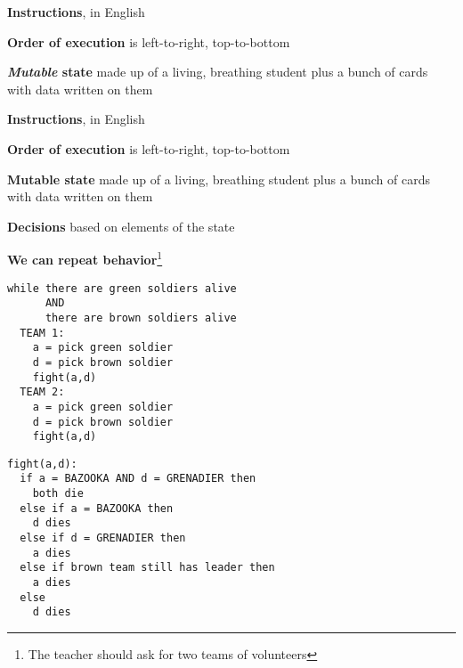 \documentclass{beamer}
\begin{document}
\begin{slide}{
\item \textbf{Instructions}, in English
\item \textbf{Order of execution} is left-to-right, top-to-bottom
\item \textbf{\textit{Mutable} state} made up of a living, breathing student plus a bunch of cards with data written on them
}\end{slide}


\begin{slide}{
\item \textbf{Instructions}, in English
\item \textbf{Order of execution} is left-to-right, top-to-bottom
\item \textbf{Mutable state} made up of a living, breathing student plus a bunch of cards with data written on them
\item \textbf{Decisions} based on elements of the state 
}\end{slide}

\begin{frame}[fragile]
\textbf{We can repeat behavior}\footnote{The teacher should ask for two teams of volunteers} \ \\

\begin{lstlisting}[basicstyle=\ttfamily\tiny]
while there are green soldiers alive
      AND
      there are brown soldiers alive
  TEAM 1:
    a = pick green soldier
    d = pick brown soldier
    fight(a,d)
  TEAM 2:
    a = pick green soldier
    d = pick brown soldier
    fight(a,d)
\end{lstlisting}



\begin{lstlisting}[basicstyle=\ttfamily\tiny]
fight(a,d):
  if a = BAZOOKA AND d = GRENADIER then
    both die
  else if a = BAZOOKA then
    d dies
  else if d = GRENADIER then
    a dies
  else if brown team still has leader then
    a dies
  else
    d dies
\end{lstlisting} 

\end{frame}
\end{document}
